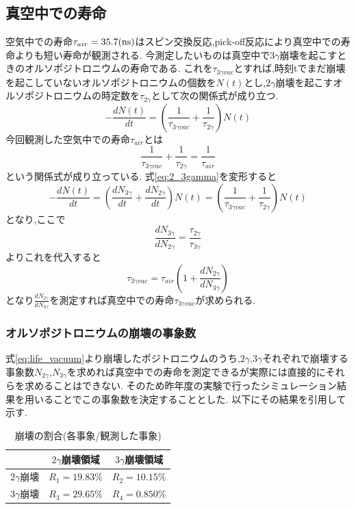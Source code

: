 \subsection{真空中での寿命}
空気中での寿命$\tau_{air}=35.7(\rm ns)$はスピン交換反応,pick-off反応により真空中での寿命よりも短い寿命が観測される.
今測定したいものは真空中で$3\gamma$崩壊を起こすときのオルソポジトロニウムの寿命である.
これを$\tau_{3\gamma vac}$とすれば,時刻tでまだ崩壊を起こしていないオルソポジトロニウムの個数を$N(t)$とし,$2\gamma$崩壊を起こすオルソポジトロニウムの時定数を$\tau_{2\gamma}$として次の関係式が成り立つ.
\begin{equation}
	-\frac{dN(t)}{dt}=\left(\frac{1}{\tau_{3\gamma vac}}+\frac{1}{\tau_{2\gamma}}\right)N(t)
	\label{eq:2_3gamma}
\end{equation}
今回観測した空気中での寿命$\tau_{air}$とは
\begin{equation}
	\frac{1}{\tau_{3\gamma vac}}+\frac{1}{\tau_{2\gamma}}=\frac{1}{\tau_{air}}
\end{equation}
という関係式が成り立っている.
式\ref{eq:2_3gamma}を変形すると
\begin{equation}
	-\frac{dN(t)}{dt}=\left(\frac{dN_{3\gamma}}{dt}+\frac{dN_{2\gamma}}{dt}\right)N(t)=\left(\frac{1}{\tau_{3\gamma vac}}+\frac{1}{\tau_{2\gamma}}\right)N(t)
\end{equation}
となり,ここで
\begin{equation}
	\frac{dN_{3\gamma}}{dN_{2\gamma}}=\frac{\tau_{2\gamma}}{\tau_{3\gamma}}
\end{equation}
よりこれを代入すると
\begin{equation}
	\tau_{3\gamma vac}=\tau_{air}\left(1+\frac{dN_{2\gamma}}{dN_{3\gamma}}\right)
	\label{eq:life_vacuum}
\end{equation}
となり$\frac{dN_{2\gamma}}{dN_{3\gamma}}$を測定すれば真空中での寿命$\tau_{3\gamma vac}$が求められる.

\subsubsection{オルソポジトロニウムの崩壊の事象数}
式\ref{eq:life_vacuum}より崩壊したポジトロニウムのうち,$2\gamma$,$3\gamma$それぞれで崩壊する事象数$N_{2\gamma}$,$N_{3\gamma}$を求めれば真空中での寿命を測定できるが実際には直接的にそれらを求めることはできない.
そのため昨年度の実験で行ったシミュレーション結果を用いることでこの事象数を決定することとした.
以下にその結果を引用して示す.
\begin{table}[htbp]
	\begin{center}
		\caption{崩壊の割合(各事象/観測した事象)}
		\begin{tabular}{|l|c|c|} \hline
			& $2\gamma$崩壊領域 & $3\gamma$崩壊領域 \\ \hline
			$2\gamma$崩壊 & $R_1=19.83\%$ & $R_2=10.15\%$\\
			$3\gamma$崩壊 & $R_3=29.65\%$ & $R_4=0.850\%$\\ \hline
		\end{tabular}
		\label{2_3gamma_ratio}
	\end{center}
\end{table}

